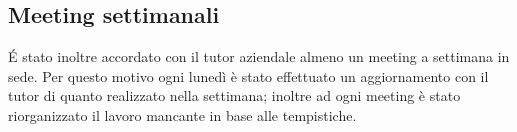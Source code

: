 \subsection*{Meeting settimanali}
É stato inoltre accordato con il tutor aziendale almeno un meeting a settimana in sede. Per questo motivo ogni lunedì è stato effettuato un aggiornamento con il tutor di quanto realizzato nella settimana; inoltre ad ogni meeting è stato riorganizzato il lavoro mancante in base alle tempistiche.

